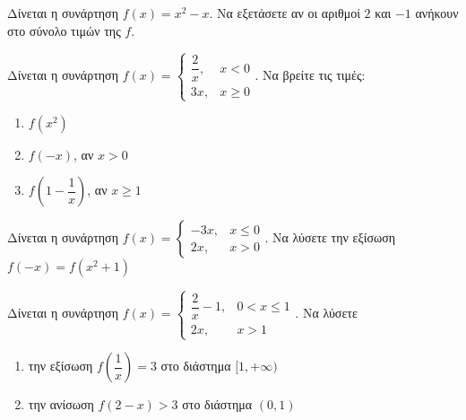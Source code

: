 \documentclass{../../presentation}
\begin{document}
\begin{askisi}
  Δίνεται η συνάρτηση $f(x)=x^2-x$. Να εξετάσετε αν οι αριθμοί $2$ και $-1$ ανήκουν στο σύνολο τιμών της $f$.
\end{askisi}

\begin{askisi}
  Δίνεται η συνάρτηση $f(x)=\begin{cases}
      \dfrac{2}{x}, & x< 0    \\
      3x,           & x \ge 0
    \end{cases}$. Να βρείτε τις τιμές:
  \begin{enumerate}[<+->]
    \item $f(x^2)$
    \item $f(-x)$, αν $x>0$
    \item $f\left(1-\dfrac{1}{x}\right)$, αν $x\ge 1$
  \end{enumerate}
\end{askisi}

\begin{askisi}
  Δίνεται η συνάρτηση $f(x)=\begin{cases}
      -3x, & x\le 0 \\
      2x,  & x > 0
    \end{cases}$. Να λύσετε την εξίσωση $f(-x)=f(x^2+1)$
\end{askisi}

\begin{askisi}
  Δίνεται η συνάρτηση $f(x)=\begin{cases}
      \dfrac{2}{x}-1, & 0<x\le 1 \\
      2x,             & x > 1
    \end{cases}$. Να λύσετε
  \begin{enumerate}[<+->]
    \item την εξίσωση $f\left(\dfrac{1}{x}\right)=3$ στο διάστημα $[1,+\infty)$
    \item την ανίσωση $f(2-x)>3$ στο διάστημα $(0,1)$
  \end{enumerate}
\end{askisi}
\end{document}

